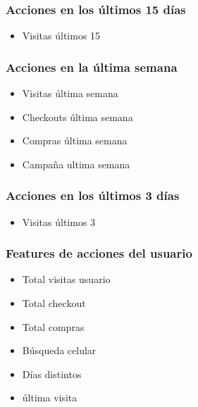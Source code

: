 \documentclass[a4paper ,12pt]{article}
\begin{document}
	
		

		\subsubsection{Acciones en los últimos 15 días}		
		
		\begin{itemize}
			\item 	Visitas últimos 15
		\end{itemize}
		


		\subsubsection{Acciones en la última semana}
			
			\begin{itemize}
				\item  Visitas última semana
				\item  Checkouts última semana
				\item  Compras última semana 
				\item Campaña ultima semana
			\end{itemize}
			

		\subsubsection{Acciones en los últimos 3 días}
		
		
		
			\begin{itemize}
				\item Visitas últimos 3
			\end{itemize}





\subsubsection{Features de acciones del usuario}

	\begin{itemize}
		\item Total visitas usuario
		
		\item Total checkout
		
		\item Total compras
		
		\item Búsqueda celular 
		
		\item Días distintos 
		
		\item última visita 
		
	\end{itemize}
	
\end{document}
